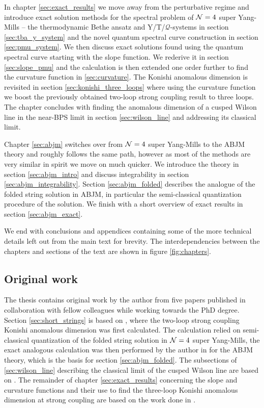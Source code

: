 In chapter \ref{sec:exact_results} we move away from the perturbative regime and introduce exact solution methods for the spectral problem of $\mathcal{N}=4$ super Yang-Mills -- the thermodynamic Bethe ansatz and Y/T/$\mathcal{Q}$-systems in section \ref{sec:tba_y_system} and the novel quantum spectral curve construction in section \ref{sec:pmu_system}.
We then discuss exact solutions found using the quantum spectral curve starting with the slope function.
We rederive it in section \ref{sec:slope_pmu} and the calculation is then extended one order further to find the curvature function in \ref{sec:curvature}.
The Konishi anomalous dimension is revisited in section \ref{sec:konishi_three_loops} where using the curvature function we boost the previously obtained two-loop strong coupling result to three loops.
The chapter concludes with finding the anomalous dimension of a cusped Wilson line in the near-BPS limit in section \ref{sec:wilson_line} and addressing its classical limit.
 
Chapter \ref{sec:abjm} switches over from $\mathcal{N}=4$ super Yang-Mills to the ABJM theory and roughly follows the same path, however as most of the methods are very similar in spirit we move on much quicker.
We introduce the theory in section \ref{sec:abjm_intro} and discuss integrability in section \ref{sec:abjm_integrability}. 
Section \ref{sec:abjm_folded} describes the analogue of the folded string solution in ABJM, in particular the semi-classical quantization procedure of the solution.
We finish with a short overview of exact results in section \ref{sec:abjm_exact}.

We end with conclusions and appendices containing some of the more technical details left out from the main text for brevity.
The interdependencies between the chapters and sections of the text are shown in figure \ref{fig:chapters}.

\newpage
\subsection{Original work}

The thesis contains original work by the author from five papers published in collaboration with fellow colleagues while working towards the PhD degree. 
Section \ref{sec:short_strings} is based on \cite{Gromov:2011bz}, where the two-loop strong coupling Konishi anomalous dimension was first calculated.
The calculation relied on semi-classical quantization of the folded string solution in $\mathcal{N}=4$ super Yang-Mills, the exact analogous calculation was then performed by the author in \cite{Beccaria:2012vb,Beccaria:2012qd} for the ABJM theory, which is the basis for section \ref{sec:abjm_folded}.
The subsections of \ref{sec:wilson_line} describing the classical limit of the cusped Wilson line are based on \cite{Sizov:2013joa}.
The remainder of chapter \ref{sec:exact_results} concerning the slope and curvature functions and their use to find the three-loop Konishi anomalous dimension at strong coupling are based on the work done in \cite{Gromov:2014bva}. 

